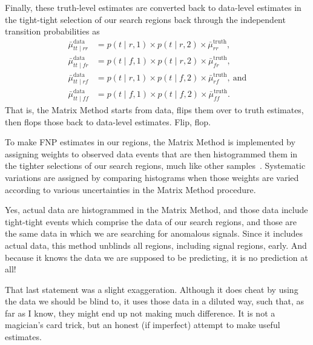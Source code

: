 Finally, these truth-level estimates are converted back to data-level
estimates in the tight-tight selection of our search regions back through the
independent transition probabilities as
\begin{align}
\bar \mu^\textrm{data}_{tt\mid rr} &=
p(t\!\mid\!r,1)
\times p(t\!\mid\!r,2)
\times \bar \mu^\textrm{truth}_{rr}, \\
\bar \mu^\textrm{data}_{tt\mid fr} &=
p(t\!\mid\!f,1)
\times p(t\!\mid\!r,2)
\times \bar \mu^\textrm{truth}_{fr}, \\
\bar \mu^\textrm{data}_{tt\mid rf} &=
p(t\!\mid\!r,1)
\times p(t\!\mid\!f,2)
\times \bar \mu^\textrm{truth}_{rf},~\textrm{and} \\
\bar \mu^\textrm{data}_{tt\mid ff} &=
p(t\!\mid\!f,1)
\times p(t\!\mid\!f,2)
\times \bar \mu^\textrm{truth}_{ff}.
\end{align}
That is, the Matrix Method starts from data, flips them over to truth
estimates, then flops those back to data-level estimates. Flip, flop.

To make FNP estimates in our regions, the Matrix Method is
implemented by assigning weights to observed data events that are then
histogrammed them in the tighter selections of our search regions,
much like other samples~\cite{twoljets2018int}.
Systematic variations are assigned by comparing histograms when those weights
are varied according to various uncertainties in the Matrix Method procedure.

Yes, actual data are histogrammed in the Matrix Method, and those data include
tight-tight events which comprise the data of our search regions, and those
are the same data in which we are searching for anomalous signals.
Since it includes actual data, this method unblinds all regions,
including signal regions, early.
And because it knows the data we are supposed to be predicting, it is no
prediction at all!

That last statement was a slight exaggeration.
Although it does cheat by using the data we should be blind to, it uses those
data in a diluted way, such that, as far as I know, they might end up not
making much difference.
It is not a magician's card trick, but an honest (if imperfect) attempt to make
useful estimates.

